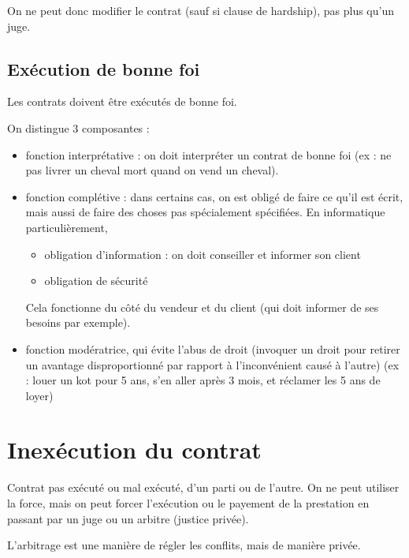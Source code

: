 		On ne peut donc modifier le contrat (sauf si clause de hardship), pas plus qu'un juge.
	
	
		\subsection{Exécution de bonne foi}
		
		Les contrats doivent être exécutés de bonne foi. 
		
		On distingue 3 composantes :
		
		\begin{itemize}
			\item fonction interprétative : on doit interpréter un contrat de bonne foi (ex : ne pas livrer un cheval mort quand on vend un cheval).
			\item fonction complétive : dans certains cas, on est obligé de faire ce qu'il est écrit, mais aussi de faire des choses pas spécialement spécifiées. En informatique particulièrement,
			
			
			\begin{itemize}
				\item obligation d'information : on doit conseiller et informer son client
				\item obligation de sécurité
			\end{itemize}
			
			Cela fonctionne du côté du vendeur et du client (qui doit informer de ses besoins par exemple).
			
			\item fonction modératrice, qui évite l'abus de droit (invoquer un droit pour retirer un avantage disproportionné par rapport à l'inconvénient causé à l'autre) (ex : louer un kot pour 5 ans, s'en aller après 3 mois, et réclamer les 5 ans de loyer)
		\end{itemize}
		
		
	\section{Inexécution du contrat}
	
	Contrat pas exécuté ou mal exécuté, d'un parti ou de l'autre. On ne peut utiliser la force, mais on peut forcer l'exécution  ou le payement de la prestation en passant par un juge ou un arbitre (justice privée).
	
	L'arbitrage est une manière de régler les conflits, mais de manière privée.
	
